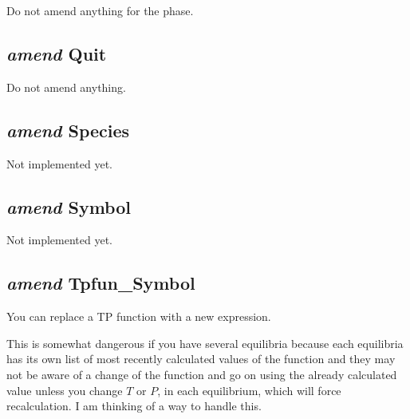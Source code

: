 \documentclass[12pt]{article}
\begin{document}
Do not amend anything for the phase.

\subsection{{\em amend} Quit}

Do not amend anything.

\subsection{{\em amend} Species}

Not implemented yet.

\subsection{{\em amend} Symbol}

Not implemented yet.

\subsection{{\em amend} Tpfun\_Symbol}

You can replace a TP function with a new expression.

This is somewhat dangerous if you have several equilibria because each
equilibria has its own list of most recently calculated values of the
function and they may not be aware of a change of the function and go
on using the already calculated value unless you change $T$ or $P$, in
each equilibrium, which will force recalculation.  I am thinking of a
way to handle this.
\end{document}
